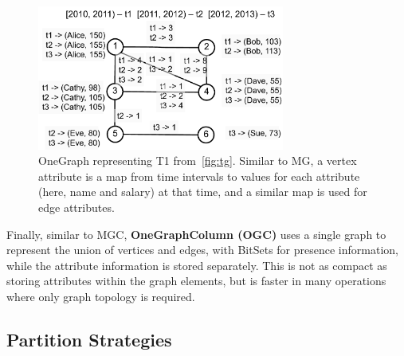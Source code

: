 \begin{figure}[t!]
\includegraphics[width=3.2in]{figs/og.pdf}
\caption{OneGraph representing T1 from~\ref{fig:tg}.  Similar to MG, a
  vertex attribute is a map from time intervals to values for each
  attribute (here, name and salary) at that time, and a similar map is
  used for edge attributes.}
\label{fig:og}
\end{figure}

Finally, similar to MGC, {\bf OneGraphColumn (OGC)} uses a single
graph to represent the union of vertices and edges, with BitSets for
presence information, while the attribute information is stored
separately.  This is not as compact as storing attributes within the
graph elements, but is faster in many operations where only graph
topology is required.

\subsection{Partition Strategies}  
\label{sec:sys:partition}


